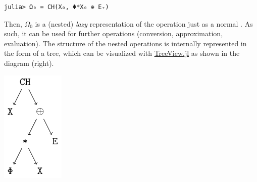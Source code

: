 \begin{minipage}{\linewidth}
\begin{lstlisting}
julia> Ω₀ = CH(X₀, Φ*X₀ ⊕ E₊)
\end{lstlisting}
\end{minipage}

\begin{minipage}{0.69\linewidth}
Then, $\Omega_0$ is a (nested) \emph{lazy} representation of the  operation just as a normal . As such, it can be used for further operations (conversion, approximation, evaluation). The structure of the nested operations is internally represented in the form of a tree, which can be visualized with \href{https://github.com/JuliaTeX/TreeView.jl}{TreeView.jl} as shown in the diagram (right).
\end{minipage}
\hfill
\begin{minipage}{0.2\linewidth}
		\includegraphics[width=\linewidth, keepaspectratio]{img/ast}
\end{minipage}

